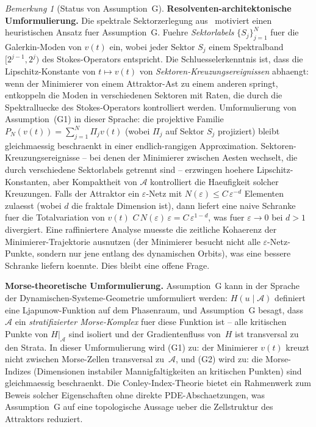 \documentclass[12pt,a4paper]{article}
\theoremstyle{definition}
\theoremstyle{plain}
\theoremstyle{remark}
\newtheorem{remark}[definition]{Bemerkung}
\begin{document}
\begin{remark}[Status von Assumption~G]
\medskip\noindent
\textbf{Resolventen-architektonische Umformulierung.}\;
Die spektrale Sektorzerlegung aus~\cite{GeigerRH2026c}
motiviert einen heuristischen Ansatz fuer Assumption~G. Fuehre \emph{Sektorlabels}
$\{S_j\}_{j=1}^{N}$ fuer die Galerkin-Moden von $v(t)$ ein, wobei jeder Sektor
$S_j$ einem Spektralband $[2^{j-1}, 2^j)$ des Stokes-Operators entspricht. Die Schluesselerkenntnis ist, dass die Lipschitz-Konstante von
$t \mapsto v(t)$ von \emph{Sektoren-Kreuzungsereignissen} abhaengt: wenn der
Minimierer von einem Attraktor-Ast zu einem anderen springt, entkoppeln die Moden in
verschiedenen Sektoren mit Raten, die durch die Spektralluecke des
Stokes-Operators kontrolliert werden. Umformulierung von Assumption~(G1) in dieser Sprache:
die projektive Familie $P_N(v(t)) = \sum_{j=1}^{N} \Pi_j v(t)$ (wobei
$\Pi_j$ auf Sektor $S_j$ projiziert) bleibt gleichmaessig beschraenkt in einer
endlich-rangigen Approximation. Sektoren-Kreuzungsereignisse -- bei denen der Minimierer
zwischen Aesten wechselt, die durch verschiedene Sektorlabels getrennt sind -- erzwingen
hoehere Lipschitz-Konstanten, aber Kompaktheit von $\mathcal{A}$ kontrolliert
die Haeufigkeit solcher Kreuzungen. Falls der Attraktor ein
$\varepsilon$-Netz mit $N(\varepsilon) \leq C\,\varepsilon^{-d}$
Elementen zulaesst (wobei $d$ die fraktale Dimension ist), dann liefert eine naive Schranke fuer
die Totalvariation von $v(t)$
$C\,N(\varepsilon)\,\varepsilon = C\,\varepsilon^{1-d}$, was
fuer $\varepsilon \to 0$ bei $d > 1$ divergiert.  Eine raffiniertere Analyse
muesste die zeitliche Kohaerenz der Minimierer-Trajektorie ausnutzen
(der Minimierer besucht nicht alle $\varepsilon$-Netz-Punkte, sondern nur jene
entlang des dynamischen Orbits), was eine bessere Schranke liefern koennte.
Dies bleibt eine offene Frage.

\medskip\noindent
\textbf{Morse-theoretische Umformulierung.}\;
Assumption~G kann in der Sprache der Dynamischen-Systeme-Geometrie
umformuliert werden: $H(u \mid \mathcal{A})$ definiert eine Ljapunow-Funktion auf dem
Phasenraum, und Assumption~G besagt, dass $\mathcal{A}$ ein
\emph{stratifizierter Morse-Komplex} fuer diese Funktion ist -- alle kritischen
Punkte von $H|_{\mathcal{A}}$ sind isoliert und der Gradientenfluss von~$H$
ist transversal zu den Strata. In dieser Umformulierung wird (G1) zu:
der Minimierer $v(t)$ kreuzt nicht zwischen Morse-Zellen
transversal zu~$\mathcal{A}$, und (G2) wird zu: die Morse-Indizes
(Dimensionen instabiler Mannigfaltigkeiten an kritischen Punkten) sind gleichmaessig
beschraenkt. Die Conley-Index-Theorie bietet ein Rahmenwerk zum Beweis
solcher Eigenschaften ohne direkte PDE-Abschaetzungen, was Assumption~G
auf eine topologische Aussage ueber die Zellstruktur des Attraktors reduziert.


\end{remark}
\end{document}
